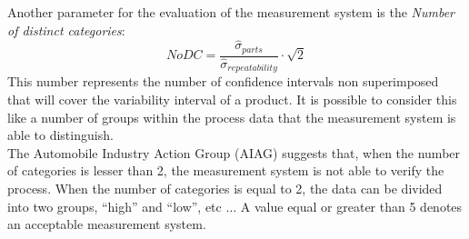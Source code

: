 \begin{frame}
\vspace*{.25cm}
Another parameter for the evaluation of the measurement system is the \textit{Number of distinct categories}:
$$NoDC=\frac{\hat{\sigma}_{parts}}{\hat{\sigma}_{repeatability}}\cdot \sqrt{2}$$
This number represents the number of confidence intervals non superimposed that will cover the variability interval of a product. It is possible to consider this like a number of groups within the process data that the measurement system is able to distinguish.\\
The Automobile Industry Action Group (AIAG) suggests that, when the number of categories is lesser than 2, the measurement system is not able to verify the process. When the number of categories is equal to 2, the data can be divided into two groups, ``high'' and ``low'', etc $\dots$ A value equal or greater than 5 denotes an acceptable measurement system.
\end{frame}
